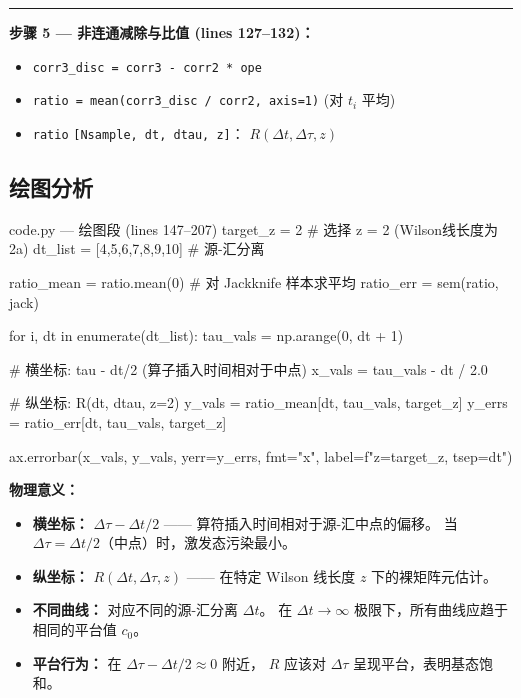 \documentclass[12pt,a4paper]{ctexart}
\begin{document}
\begin{center}
{\begin{minipage}{0.92\textwidth}
\bigskip
\hrule
\bigskip

\textbf{步骤 5 --- 非连通减除与比值 (lines 127--132)：}
\begin{itemize}
    \item \texttt{corr3\_disc = corr3 - corr2 * ope}
    \item \texttt{ratio = mean(corr3\_disc / corr2, axis=1)} (对 $t_i$ 平均)
    \item \texttt{ratio} \texttt{[Nsample, dt, dtau, z]}：
        $R(\Delta t, \Delta\tau, z)$
\end{itemize}
\end{minipage}
}
\end{center}

\subsection{绘图分析}

\begin{codeblock}{code.py --- 绘图段 (lines 147--207)}
target_z = 2          # 选择 z = 2 (Wilson线长度为2a)
dt_list = [4,5,6,7,8,9,10]  # 源-汇分离

ratio_mean = ratio.mean(0)  # 对 Jackknife 样本求平均
ratio_err  = sem(ratio, jack)

for i, dt in enumerate(dt_list):
    tau_vals = np.arange(0, dt + 1)

    # 横坐标: tau - dt/2  (算子插入时间相对于中点)
    x_vals = tau_vals - dt / 2.0

    # 纵坐标: R(dt, dtau, z=2)
    y_vals = ratio_mean[dt, tau_vals, target_z]
    y_errs = ratio_err[dt, tau_vals, target_z]

    ax.errorbar(x_vals, y_vals, yerr=y_errs,
                fmt="x", label=f"z={target_z}, tsep={dt}")
\end{codeblock}

\textbf{物理意义：}
\begin{itemize}
    \item \textbf{横坐标：} $\Delta\tau - \Delta t/2$ —— 算符插入时间相对于源-汇中点的偏移。
        当 $\Delta\tau = \Delta t/2$（中点）时，激发态污染最小。
    \item \textbf{纵坐标：} $R(\Delta t, \Delta\tau, z)$ ——
        在特定 Wilson 线长度 $z$ 下的裸矩阵元估计。
    \item \textbf{不同曲线：} 对应不同的源-汇分离 $\Delta t$。
        在 $\Delta t \to \infty$ 极限下，所有曲线应趋于相同的平台值 $c_0$。
    \item \textbf{平台行为：} 在 $\Delta\tau - \Delta t/2 \approx 0$ 附近，
        $R$ 应该对 $\Delta\tau$ 呈现平台，表明基态饱和。
\end{itemize}
\end{document}
